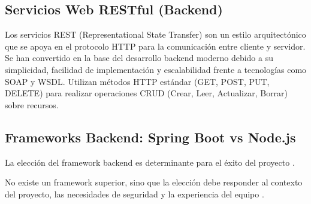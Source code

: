 \subsection{Servicios Web RESTful (Backend)}
Los servicios REST (Representational State Transfer) son un estilo arquitectónico que se apoya en el protocolo HTTP para la comunicación entre cliente y servidor. Se han convertido en la base del desarrollo backend moderno debido a su simplicidad, facilidad de implementación y escalabilidad frente a tecnologías como SOAP y WSDL. Utilizan métodos HTTP estándar (GET, POST, PUT, DELETE) para realizar operaciones CRUD (Crear, Leer, Actualizar, Borrar) sobre recursos.

\subsection{Frameworks Backend: Spring Boot vs Node.js}
La elección del framework backend es determinante para el éxito del proyecto \cite{haro2019nodejs}.

No existe un framework superior, sino que la elección debe responder al contexto del proyecto, las necesidades de seguridad y la experiencia del equipo \cite{brito_consideraciones}.